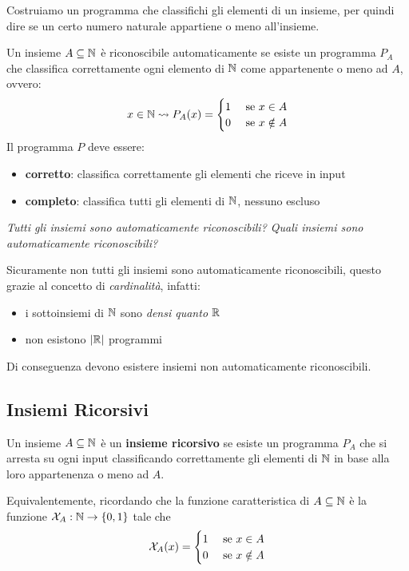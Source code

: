 Costruiamo un programma che classifichi gli elementi di un insieme, per quindi dire se un certo numero naturale appartiene o meno all'insieme.

Un insieme $A \subseteq \mathbb{N}$ è riconoscibile automaticamente se esiste un programma $P_A$ che classifica correttamente ogni elemento di $\mathbb{N}$ come appartenente o meno ad $A$, ovvero:
$$
x \in \mathbb{N} \rightsquigarrow P_A (x) = \begin{cases}
	1 & \text{ se } x \in A \\
	0 & \text{ se } x \notin A
\end{cases}
$$
Il programma $P$ deve essere:
\begin{itemize}
	\item \textbf{corretto}: classifica correttamente gli elementi che riceve in input
	\item \textbf{completo}: classifica  tutti gli elementi di $\mathbb{N}$, nessuno escluso
\end{itemize}

\textit{Tutti gli insiemi sono automaticamente riconoscibili? Quali insiemi sono automaticamente riconoscibili?}

Sicuramente non tutti gli insiemi sono automaticamente riconoscibili, questo grazie al concetto di \textit{cardinalità}, infatti:
\begin{itemize}
	\item i sottoinsiemi di $\mathbb{N}$ sono \textit{densi quanto} $\mathbb{R}$
	\item non esistono $|\mathbb{R}|$ programmi
\end{itemize}
Di conseguenza devono esistere insiemi non automaticamente riconoscibili.

\subsection{Insiemi Ricorsivi}

Un insieme $A \subseteq \mathbb{N}$ è un \textbf{insieme ricorsivo} se esiste un programma $P_A$ che si arresta su ogni input classificando correttamente gli elementi di $\mathbb{N}$ in base alla loro appartenenza o meno ad $A$.

Equivalentemente, ricordando che la funzione caratteristica di $A \subseteq \mathbb{N}$ è la funzione $ \mathcal{X}_A : \mathbb{N} \rightarrow \{0,1\} $ tale che
$$
\mathcal{X}_A (x) = \begin{cases}
	1 & \text{ se } x \in A \\
	0 & \text{ se } x \notin A
\end{cases}
$$

